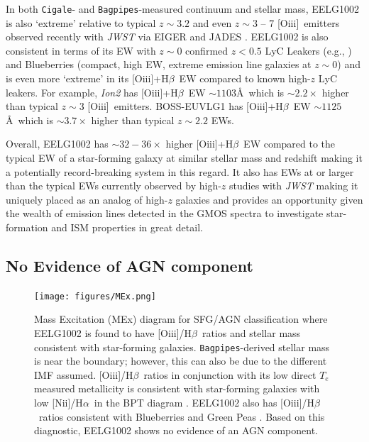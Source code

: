 \documentclass[twocolumn,tight,times,linenumbers]{aastex631}
\newcommand{\halpha}{H$\alpha$}
\newcommand{\hbeta}{H$\beta$}
\newcommand{\nii}{[N{\sc ii}]}
\newcommand{\oiii}{[O{\sc iii}]}
\newcommand{\cigale}{\texttt{Cigale}}
\newcommand{\bagpipes}{\texttt{Bagpipes}}
\begin{document}
		In both \cigale- and \bagpipes-measured continuum and stellar mass, EELG1002 is also `extreme' relative to typical $z \sim 3.2$ \citep{Khostovan2016} and even $z \sim 3$ -- 7 \oiii~emitters observed recently with \textit{JWST} via EIGER \citep{Matthee2023}  and JADES \citep{Boyett2024}. EELG1002 is also consistent in terms of its EW with $z \sim 0$ confirmed $z< 0.5$ LyC Leakers (e.g., \citealt{Izotov2016,Izotov2018,Izotov2021}) and Blueberries \citep{Yang2017_BB} (compact, high EW, extreme emission line galaxies at $z \sim 0$) and is even more `extreme' in its \oiii+\hbeta~EW compared to known high-$z$ LyC leakers. For example, \textit{Ion2} \citep{deBarros2016} has \oiii+\hbeta~EW $\sim 1103$\AA~which is $\sim 2.2\times$ higher than typical $z \sim 3$ \oiii~emitters. BOSS-EUVLG1 \citep{Marques-Chaves2020} has \oiii+\hbeta~EW $\sim 1125$\AA~which is $\sim 3.7\times$ higher than typical $z \sim 2.2$ EWs.
		
		Overall, EELG1002 has $\sim 32 - 36 \times$ higher \oiii+\hbeta~EW compared to the typical EW of a star-forming galaxy at similar stellar mass and redshift making it a potentially record-breaking system in this regard. It also has EWs at or larger than the typical EWs currently observed by high-$z$ studies with \textit{JWST} making it uniquely placed as an analog of high-$z$ galaxies and provides an opportunity given the wealth of emission lines detected in the GMOS spectra to investigate star-formation and ISM properties in great detail.


		\subsection{No Evidence of AGN component}
		\label{sec:AGN}
		
		\begin{figure}
			\centering
			\texttt{[image: figures/MEx.png]}
			\caption{Mass Excitation (MEx) diagram for SFG/AGN classification where EELG1002 is found to have \oiii/\hbeta~ratios and stellar mass consistent with star-forming galaxies. \bagpipes-derived stellar mass is near the boundary; however, this can also be due to the different IMF assumed. \oiii/\hbeta~ratios in conjunction with its low direct $T_e$ measured metallicity is consistent with star-forming galaxies with low \nii/\halpha~in the BPT diagram \citep{Pettini2004, Marino2013}. EELG1002 also has \oiii/\hbeta~ratios consistent with Blueberries \citep{Yang2017_BB} and Green Peas \citep{Yang2017_GP}. Based on this diagnostic, EELG1002 shows no evidence of an AGN component.}
			\label{fig:BPT_MEx}
		\end{figure}
		
\end{document}
